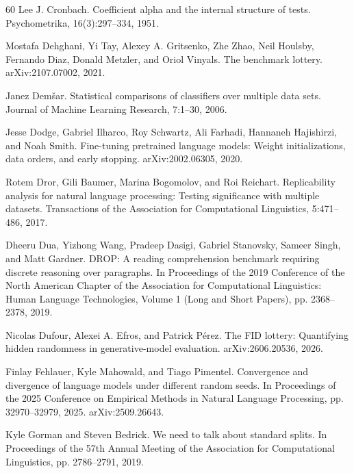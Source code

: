 \begin{thebibliography}{60}
Lee J. Cronbach. Coefficient alpha and the internal structure of tests. Psychometrika, 16(3):297--334, 1951.

Mostafa Dehghani, Yi Tay, Alexey A. Gritsenko, Zhe Zhao, Neil Houlsby, Fernando Diaz, Donald Metzler, and Oriol Vinyals. The benchmark lottery. arXiv:2107.07002, 2021.

Janez Dem\v{s}ar. Statistical comparisons of classifiers over multiple data sets. Journal of Machine Learning Research, 7:1--30, 2006.

Jesse Dodge, Gabriel Ilharco, Roy Schwartz, Ali Farhadi, Hannaneh Hajishirzi, and Noah Smith. Fine-tuning pretrained language models: Weight initializations, data orders, and early stopping. arXiv:2002.06305, 2020.

Rotem Dror, Gili Baumer, Marina Bogomolov, and Roi Reichart. Replicability analysis for natural language processing: Testing significance with multiple datasets. Transactions of the Association for Computational Linguistics, 5:471--486, 2017.

Dheeru Dua, Yizhong Wang, Pradeep Dasigi, Gabriel Stanovsky, Sameer Singh, and Matt Gardner. DROP: A reading comprehension benchmark requiring discrete reasoning over paragraphs. In Proceedings of the 2019 Conference of the North American Chapter of the Association for Computational Linguistics: Human Language Technologies, Volume 1 (Long and Short Papers), pp. 2368--2378, 2019.

Nicolas Dufour, Alexei A. Efros, and Patrick P\'{e}rez. The FID lottery: Quantifying hidden randomness in generative-model evaluation. arXiv:2606.20536, 2026.

Finlay Fehlauer, Kyle Mahowald, and Tiago Pimentel. Convergence and divergence of language models under different random seeds. In Proceedings of the 2025 Conference on Empirical Methods in Natural Language Processing, pp. 32970--32979, 2025. arXiv:2509.26643.

Kyle Gorman and Steven Bedrick. We need to talk about standard splits. In Proceedings of the 57th Annual Meeting of the Association for Computational Linguistics, pp. 2786--2791, 2019.


\end{thebibliography}
